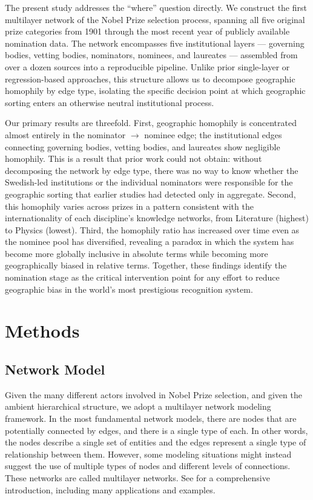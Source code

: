 \documentclass[11pt]{article}
\begin{document}
The present study addresses the ``where'' question directly. We construct the first multilayer network of the Nobel Prize selection process, spanning all five original prize categories from 1901 through the most recent year of publicly available nomination data. The network encompasses five institutional layers --- governing bodies, vetting bodies, nominators, nominees, and laureates --- assembled from over a dozen sources into a reproducible pipeline. Unlike prior single-layer or regression-based approaches, this structure allows us to decompose geographic homophily by edge type, isolating the specific decision point at which geographic sorting enters an otherwise neutral institutional process.

Our primary results are threefold. First, geographic homophily is concentrated almost entirely in the nominator $\to$ nominee edge; the institutional edges connecting governing bodies, vetting bodies, and laureates show negligible homophily. This is a result that prior work could not obtain: without decomposing the network by edge type, there was no way to know whether the Swedish-led institutions or the individual nominators were responsible for the geographic sorting that earlier studies had detected only in aggregate. Second, this homophily varies across prizes in a pattern consistent with the internationality of each discipline's knowledge networks, from Literature (highest) to Physics (lowest). Third, the homophily ratio has increased over time even as the nominee pool has diversified, revealing a paradox in which the system has become more globally inclusive in absolute terms while becoming more geographically biased in relative terms. Together, these findings identify the nomination stage as the critical intervention point for any effort to reduce geographic bias in the world's most prestigious recognition system.

\section{Methods}
\label{sec:methods}

\subsection{Network Model}
\label{sec:networkmodel}

Given the many different actors involved in Nobel Prize selection, and given the ambient hierarchical structure, we adopt a multilayer network modeling framework. In the most fundamental network models, there are nodes that are potentially connected by edges, and there is a single type of each. In other words, the nodes describe a single set of entities and the edges represent a single type of relationship between them. However, some modeling situations might instead suggest the use of multiple types of nodes and different levels of connections. These networks are called multilayer networks. See \citet{KivAreBar2014} for a comprehensive introduction, including many applications and examples.
\end{document}
